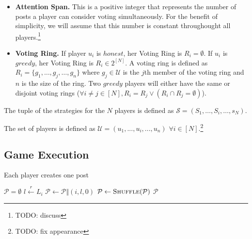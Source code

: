 \begin{itemize}
\begin{itemize}
          A $greedy$ player only votes for posts produced by users of its Voting
          Ring. The value of vote for a player if $u_i$ is $greedy$ is defined
          as $v_{G,i} = a \cdot \mathcal{VP}_i \cdot
          \mathcal{SP}_i$,\footnote{TODO: same} as in our model all $greedy$
          votes are executed with full weight.

          \item \textbf{Attention Span.} This is a positive integer that
          represents the number of posts a player can consider voting
          simultaneously. For the benefit of simplicity, we will assume that this
          number is constant throughought all players.\footnote{TODO: discuss}

          \item \textbf{Voting Ring.}  If player $u_i$ is $honest$, her Voting
          Ring is $R_i = \emptyset$. If $u_i$ is $greedy$, her Voting Ring is $R_i
          \in 2^{\left[N\right]}$. A voting ring is defined as $R_i = \lbrace
          g_1, \dots, g_j, \dots, g_n \rbrace$ where $g_j \in \mathcal{U}$ is the
          $j$th member of the voting ring and $n$ is the size of the ring. Two
          $greedy$ players will either have the same or disjoint voting rings
          ($\forall i \neq j \in \left[N\right], R_i = R_j \vee \left(R_i \cap
          R_j = \emptyset\right)$).
        \end{itemize}
        The tuple of the strategies for the $N$ players is defined as
        $\mathcal{S} = (S_1, \dots, S_i, \dots, s_N)$.
      \end{itemize}
      The set of players is defined as $\mathcal{U} = ( u_1,..., u_i,..., u_n )$
      $\forall i \in \left[N\right]$.\footnote{TODO: fix appearance}

  \subsection{Game Execution}
    \begin{algorithm}
      \caption{Each player creates one post}
      \label{alg:postGen}
      \begin{algorithmic}[1]
        \State $\mathcal{P} = \emptyset$ 
           \State $l \xleftarrow{r} L_i$
           \State $\mathcal{P} \leftarrow \mathcal{P} \Vert \left(i, l, 0\right)$
        \EndFor
        \State $\mathcal{P} \leftarrow \textsc{Shuffle}(\mathcal{P})$
        \State \Return $\mathcal{P}$
      \EndFunction
      \end{algorithmic}
    \end{algorithm}

